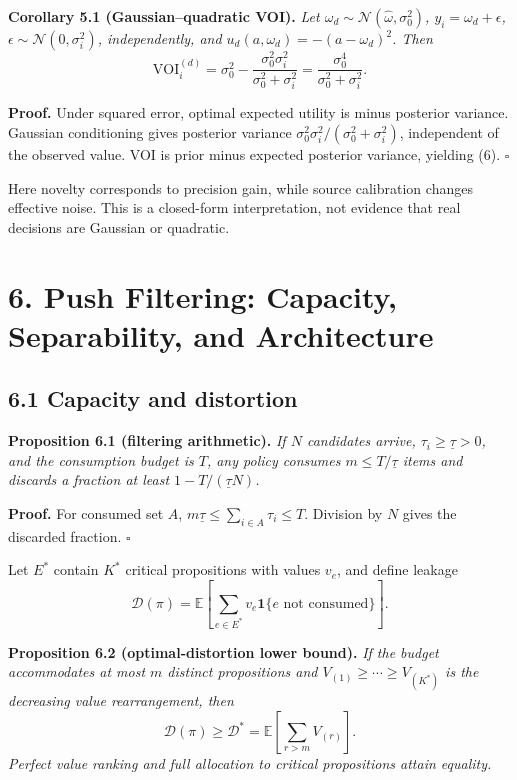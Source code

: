 \documentclass[
  11pt]{article}
\begin{document}
\textbf{Corollary 5.1 (Gaussian--quadratic VOI).} \emph{Let \(\omega_d\sim\mathcal N(\hat\omega,\sigma_0^2)\), \(y_i=\omega_d+\epsilon\), \(\epsilon\sim\mathcal N(0,\sigma_i^2)\), independently, and \(u_d(a,\omega_d)=-(a-\omega_d)^2\). Then} \[
\mathrm{VOI}_i^{(d)}=\sigma_0^2-
\frac{\sigma_0^2\sigma_i^2}{\sigma_0^2+\sigma_i^2}
=\frac{\sigma_0^4}{\sigma_0^2+\sigma_i^2}.
\tag{6}
\]

\textbf{Proof.} Under squared error, optimal expected utility is minus posterior variance. Gaussian conditioning gives posterior variance \(\sigma_0^2\sigma_i^2/(\sigma_0^2+\sigma_i^2)\), independent of the observed value. VOI is prior minus expected posterior variance, yielding (6). \(\square\)

Here novelty corresponds to precision gain, while source calibration changes effective noise. This is a closed-form interpretation, not evidence that real decisions are Gaussian or quadratic.

\section{6. Push Filtering: Capacity, Separability, and Architecture}\label{push-filtering-capacity-separability-and-architecture}

\subsection{6.1 Capacity and distortion}\label{capacity-and-distortion}

\textbf{Proposition 6.1 (filtering arithmetic).} \emph{If \(N\) candidates arrive, \(\tau_i\geq\underline\tau>0\), and the consumption budget is \(T\), any policy consumes \(m\leq T/\underline\tau\) items and discards a fraction at least \(1-T/(\underline\tau N)\).}

\textbf{Proof.} For consumed set \(A\), \(m\underline\tau\leq\sum_{i\in A}\tau_i\leq T\). Division by \(N\) gives the discarded fraction. \(\square\)

Let \(E^*\) contain \(K^*\) critical propositions with values \(v_e\), and define leakage \[
\mathcal D(\pi)=\mathbb E\!\left[\sum_{e\in E^*}v_e\mathbf 1\{e\text{ not consumed}\}\right].
\]

\textbf{Proposition 6.2 (optimal-distortion lower bound).} \emph{If the budget accommodates at most \(m\) distinct propositions and \(V_{(1)}\geq\cdots\geq V_{(K^*)}\) is the decreasing value rearrangement, then} \[
\mathcal D(\pi)\geq\mathcal D^*
=\mathbb E\!\left[\sum_{r>m}V_{(r)}\right].
\tag{7}
\] \emph{Perfect value ranking and full allocation to critical propositions attain equality.}
\end{document}
